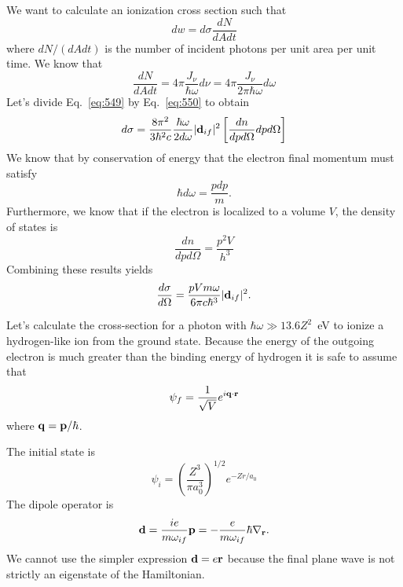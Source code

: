 We want to calculate an ionization cross section such that
\begin{equation}
dw = d\sigma \frac{dN}{dA dt}
\label{eq:542}
\end{equation}
where $dN/(dA dt)$ is the number of incident photons per unit area per
unit time.  We know that
\begin{equation}
\frac{dN}{dA dt} = 4\pi \frac{J_\nu}{\hbar \omega} d\nu =
4\pi \frac{J_\nu}{2\pi \hbar\omega} d\omega
\label{eq:543}
\end{equation}
Let's divide Eq.~\ref{eq:549} by Eq.~\ref{eq:550} to obtain
\begin{equation}
d\sigma = \frac{8\pi^2}{3 \hbar^2 c} \frac{\hbar\omega}{2 d\omega} | {\bf d}_{if} |^2 \left [
  \frac{dn}{dp d\Omega} dp d\Omega \right ] 
\label{eq:544}
\end{equation}
We know that by conservation of energy that the electron final
momentum must satisfy
\begin{equation}
\hbar d \omega = \frac{p dp}{m}.
\label{eq:545}
\end{equation}
Furthermore, we know that if the electron is localized to a volume
$V$, the density of states is
\begin{equation}
\frac{dn}{dpd\Omega} = \frac{p^2 V}{h^3}
\label{eq:546}
\end{equation}
Combining these results yields
\begin{equation}
\frac{d\sigma}{d\Omega} = \frac{p V m \omega}{6\pi c \hbar^3} |{\bf d}_{if} |^2 .
\label{eq:547}
\end{equation}

Let's calculate the cross-section for a photon with $\hbar\omega \gg
13.6 Z^2$~eV to ionize a hydrogen-like ion from the ground state.
Because the energy of the outgoing electron is much greater than the
binding energy of hydrogen it is safe to assume that
\begin{equation}
\psi_f = \frac{1}{\sqrt{V}} e^{i {\bf q}\cdot {\bf r}}
\label{eq:548}
\end{equation}
where ${\bf q}={\bf p}/\hbar$.

The initial state is
\begin{equation}
\psi_i = \left ( \frac{Z^3}{\pi a_0^3} \right )^{1/2} e^{-Zr/a_0}
\label{eq:549}
\end{equation}
The dipole operator is
\begin{equation}
{\bf d}=\frac{ie}{m \omega_{if}} {\bf p} = -\frac{e}{m
  \omega_{if}} \hbar \nabla_{\bf r}.
\label{eq:550}
\end{equation}
We cannot use the simpler expression ${\bf d}=e{\bf r}$
because the final plane wave is not strictly an eigenstate of the
Hamiltonian. 

